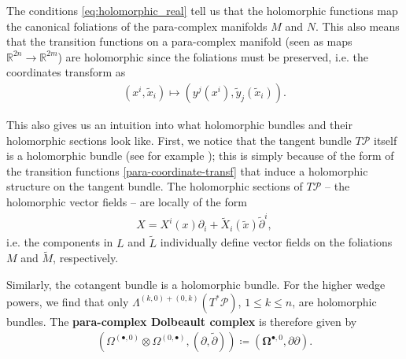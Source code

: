 \documentclass{article}
\newcommand{\RR}{\mathbb{R}}
\newcommand{\PS}{\mathcal{P}}
\newcommand{\ap}{\alpha}
\newcommand{\p}{\partial}
\newcommand{\pt}{\tilde{\partial}}
\newcommand{\xt}{{\tilde{x}}}
\newcommand{\rd}{\mathrm{d}}
\newcommand{\Lt}{\tl{L}}
\newcommand{\yt}{\tl{y}}
\newcommand{\Mt}{\tl{M}}
\newcommand{\pd}{\p\!\!\!\p}
\def\tl{\tilde}
\newtheorem{lemma}[theorem]{Lemma}
\theoremstyle{definition}
\theoremstyle{remark}
\begin{document}
The conditions \eqref{eq:holomorphic_real} tell us that the holomorphic functions map the canonical foliations of the para-complex manifolds $M$ and $N$. This also means that the transition functions on a para-complex manifold (seen as maps $\RR^{2n}\rightarrow \RR^{2m}$) are holomorphic since the foliations must be preserved, i.e. the coordinates transform as
\begin{align}\label{para-coordinate-transf}
(x^i,\xt_i)\mapsto (y^j(x^i),\yt_j(\xt_i)).
\end{align}

This also gives us an intuition into what holomorphic bundles and their holomorphic sections look like. First, we notice that the tangent bundle $T\PS$ itself is a holomorphic bundle (see for example \cite{Cortes:2003zd,Hu:2019zro}); this is simply because of the form of the transition functions \eqref{para-coordinate-transf} that induce a holomorphic structure on the tangent bundle. The holomorphic sections of $T\PS$ -- the holomorphic vector fields -- are locally of the form
\begin{align*}
X= X^i(x)\p_i+\tl{X}_i(\xt)\pt^i,
\end{align*}
i.e. the components in $L$ and $\Lt$ individually define vector fields on the foliations $M$ and $\Mt$, respectively.  

Similarly, the cotangent bundle is a holomorphic bundle. For the higher wedge powers, we find that only $\Lambda^{(k,0)+(0,k)}(T^*\PS)$, $1\leq k\leq n$, are holomorphic bundles. The {\bf para-complex Dolbeault complex} is therefore given by
\begin{align}
\left(\Omega^{(\bullet,0)}\otimes\Omega^{(0,\bullet)},(\p,\pt)\right)\coloneqq \left(\mathbf{\Omega}^{\bullet,0},\pd\right).
\end{align}
\end{document}
